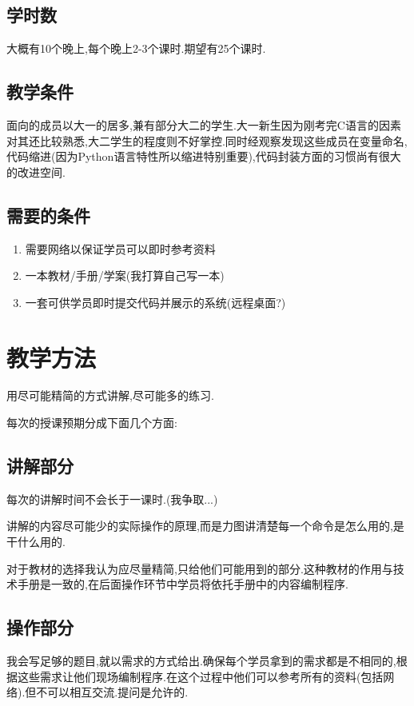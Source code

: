 \documentclass[12pt,a4paper]{article}
\begin{document}
\subsection{学时数}
大概有10个晚上,每个晚上2-3个课时.期望有25个课时.

\subsection{教学条件}
面向的成员以大一的居多,兼有部分大二的学生.大一新生因为刚考完C语言的因素对其还比较熟悉,大二学生的程度则不好掌控.同时经观察发现这些成员在变量命名,代码缩进(因为Python语言特性所以缩进特别重要),代码封装方面的习惯尚有很大的改进空间.

\subsection{需要的条件}
\begin{enumerate}
\item 需要网络以保证学员可以即时参考资料
\item 一本教材/手册/学案(我打算自己写一本)\
\item 一套可供学员即时提交代码并展示的系统(远程桌面?)
\end{enumerate}


\section{教学方法}
用尽可能精简的方式讲解,尽可能多的练习.

每次的授课预期分成下面几个方面:
\subsection{讲解部分}
每次的讲解时间不会长于一课时.(我争取...)

讲解的内容尽可能少的实际操作的原理,而是力图讲清楚每一个命令是怎么用的,是干什么用的.

对于教材的选择我认为应尽量精简,只给他们可能用到的部分.这种教材的作用与技术手册是一致的,在后面操作环节中学员将依托手册中的内容编制程序.

\subsection{操作部分}

我会写足够的题目,就以需求的方式给出.确保每个学员拿到的需求都是不相同的,根据这些需求让他们现场编制程序.在这个过程中他们可以参考所有的资料(包括网络).但不可以相互交流.提问是允许的.
\end{document}
